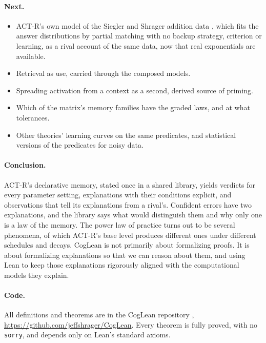 \documentclass[11pt]{article}
\newcommand{\code}[1]{\texttt{#1}}
\begin{document}
\paragraph{Next.}
\begin{itemize}
  \item ACT-R's own model of the Siegler and Shrager addition data \citep{siegler1984}, which fits the answer distributions by partial matching with no backup strategy, criterion or learning, as a rival account of the same data, now that real exponentials are available.
  \item Retrieval as use, carried through the composed models.
  \item Spreading activation from a context as a second, derived source of priming.
  \item Which of the matrix's memory families have the graded laws, and at what tolerances.
  \item Other theories' learning curves on the same predicates, and statistical versions of the predicates for noisy data.
\end{itemize}

\paragraph{Conclusion.} ACT-R's declarative memory, stated once in a shared library, yields verdicts for every parameter setting, explanations with their conditions explicit, and observations that tell its explanations from a rival's. Confident errors have two explanations, and the library says what would distinguish them and why only one is a law of the memory. The power law of practice turns out to be several phenomena, of which ACT-R's base level produces different ones under different schedules and decays. CogLean is not primarily about formalizing proofs. It is about formalizing explanations so that we can reason about them, and using Lean to keep those explanations rigorously aligned with the computational models they explain.

\paragraph{Code.} All definitions and theorems are in the CogLean repository \citep{coglean}, \url{https://github.com/jeffshrager/CogLean}. Every theorem is fully proved, with no \code{sorry}, and depends only on Lean's standard axioms.



\end{document}
